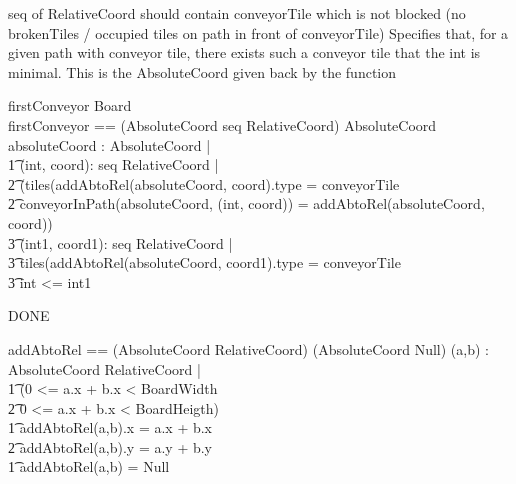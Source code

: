 \documentclass[a4paper,11pt]{article}
\begin{document}
seq of RelativeCoord should contain conveyorTile which is not blocked (no brokenTiles / occupied tiles on path in front of conveyorTile)
Specifies that, for a given path with conveyor tile, there exists such a conveyor tile that the int is minimal. This is the AbsoluteCoord given back by the function
\begin{schema}{firstConveyor}
\Xi Board \\
firstConveyor == (AbsoluteCoord \cross seq RelativeCoord) \rightarrow AbsoluteCoord
\where
\exists absoluteCoord : AbsoluteCoord |  \\ \t1
\exists (int, coord): seq RelativeCoord |  \\ \t2
(tiles(addAbtoRel(absoluteCoord, coord).type = conveyorTile \\ \t2
conveyorInPath(absoluteCoord, (int, coord)) = addAbtoRel(absoluteCoord, coord)) \implies \\ \t3
\forall (int1, coord1): seq RelativeCoord | \\ \t3
\IF tiles(addAbtoRel(absoluteCoord, coord1).type = conveyorTile \\ \t3
\THEN int <= int1
\end{schema}

DONE
\begin{axdef}
addAbtoRel == (AbsoluteCoord \cross RelativeCoord) \rightarrow (AbsoluteCoord \union Null)
\where
\forall (a,b) : AbsoluteCoord \cross RelativeCoord | \\ \t1
\IF (0 <= a.x + b.x < BoardWidth \\ \t2
0 <= a.x + b.x < BoardHeigth) \\ \t1
\THEN
addAbtoRel(a,b).x = a.x + b.x \\ \t2
addAbtoRel(a,b).y = a.y + b.y \\ \t1
\ELSE addAbtoRel(a,b) = Null
\end{axdef}
\end{document}

